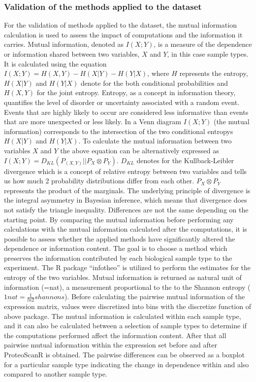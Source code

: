 \documentclass[
  11pt,
]{article}
\begin{document}
\hypertarget{validation-of-the-methods-applied-to-the-dataset}{%
\subsubsection{Validation of the methods applied to the dataset}\label{validation-of-the-methods-applied-to-the-dataset}}

For the validation of methods applied to the dataset, the mutual information calculation is used to assess the impact of computations and the information it carries.
Mutual information, denoted as \(I(X;Y)\), is a measure of the dependence or information shared between two variables, \(X\) and \(Y\), in this case sample types. It is calculated using the equation \(I(X;Y) = H(X,Y) - H(X|Y) - H(Y|X)\), where \(H\) represents the entropy, \(H(X|Y)\) and \(H(Y|X)\) denote for the both conditional probabilities and \(H(X,Y)\) for the joint entropy.
Entropy, as a concept in information theory, quantifies the level of disorder or uncertainty associated with a random event. Events that are highly likely to occur are considered less informative than events that are more unexpected or less likely. In a Venn diagram \(I(X;Y)\) (the mutual information) corresponds to the intersection of the two conditional entropys \(H(X|Y)\) and \(H(Y|X)\). To calculate the mutual information between two variables \(X\) and \(Y\) the above equation can be alternatively expressed as \(I(X;Y) = D_{KL} (P_{(X,Y)} || P_{X} \otimes P_{Y})\). \(D_{KL}\) denotes for the Kullback-Leibler \citep{Kullback1951} divergence which is a concept of relative entropy between two variables and tells us how much 2 probability distributions differ from each other. \(P_{X} \otimes P_{Y}\) represents the product of the marginals. The underlying principle of divergence is the integral asymmetry in Bayesian inference, which means that divergence does not satisfy the triangle inequality. Differences are not the same depending on the starting point. By comparing the mutual information before performing any calculations with the mutual information calculated after the computations, it is possible to assess whether the applied methods have significantly altered the dependence or information content. The goal is to choose a method which preserves the information contributed by each biological sample type to the experiment.
The R package ``infotheo'' is utilized to perform the estimates for the entropy of the two variables. Mutual information is returned as natural unit of information (=nat), a measurement proportional to the to the Shannon entropy (\(1nat = \frac{1}{ln2} shannons\)). Before calculating the pairwise mutual information of the expression matrix, values were discretized into bins with the discretize function of above package.
The mutual information is calculated within each sample type, and it can also be calculated between a selection of sample types to determine if the computations performed affect the information content. After that all pairwise mutual information within the expression set before and after ProteoScanR is obtained. The pairwise differences can be observed as a boxplot for a particular sample type indicating the change in dependence within and also compared to another sample type.
\end{document}
